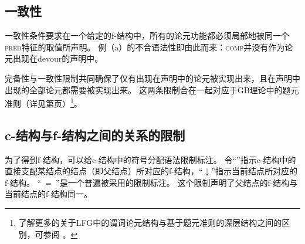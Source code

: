 \subsection{一致性}

一致性条件要求在一个给定的f-结构中，所有的论元功能都必须局部地被同一个\textsc{pred}特征的取值所声明。
例（a）的不合语法性即由此而来：\textsc{comp}并没有作为论元出现在devour的声明中。

\eal
{}
\zl

\noindent
完备性与一致性限制共同确保了仅有出现在\pred 声明中的论元被实现出来，且在\pred 声明中出现的全部论元都需要被实现出来。
这两条限制合在一起对应于GB理论中的题元准则（详见第\pageref{theta-Kriterium}页）\footnote{%
了解更多的关于LFG中的谓词论元结构与基于题元准则的深层结构之间的区别，可参阅 。
}。


\subsection{c-结构与f-结构之间的关系的限制}  

为了得到f-结构，可以给c-结构中的符号分配语法限制标注。
令“\up”\isce{$\uparrow$}{$\uparrow$}指示c-结构中的直接支配某结点的结点（即父结点）所对应的f-结构，“$\downarrow$”\isce{$\downarrow$}{$\downarrow$}指示当前结点所对应的f-结构。
“\up~=~\down”是一个普遍被采用的限制标注。
这个限制声明了父结点的f-结构与当前结点的f-结构同一。

